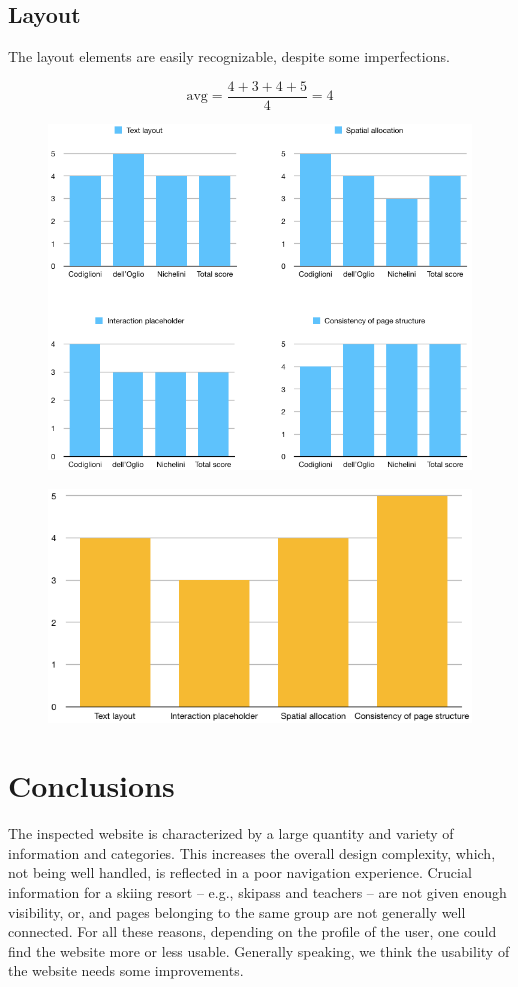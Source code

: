 \documentclass[a4paper, 11pt, parskip=half, headsepline]{scrreprt}
\begin{document}
\section{Layout}

The layout elements are easily recognizable, despite some imperfections.

\[ \mathrm{avg} = \frac{4+3+4+5}{4} = 4 \]

\begin{figure}[H]
    \centering
    \includegraphics[width=0.8\linewidth, keepaspectratio]{layout-graph-1}
\end{figure}

\begin{figure}[H]
    \centering
    \includegraphics[width=0.75\linewidth, keepaspectratio]{layout-graph-2}
\end{figure}




\chapter{Conclusions}
\label{chapter:conclusions}

The inspected website is characterized by a large quantity and variety of information and categories. This increases the overall design complexity, which, not being well handled, is reflected in a poor navigation experience. Crucial information for a skiing resort -- e.g., skipass and teachers -- are not given enough visibility, or, and pages belonging to the same group are not generally well connected. For all these reasons, depending on the profile of the user, one could find the website more or less usable. Generally speaking, we think the usability of the website needs some improvements.
\end{document}
